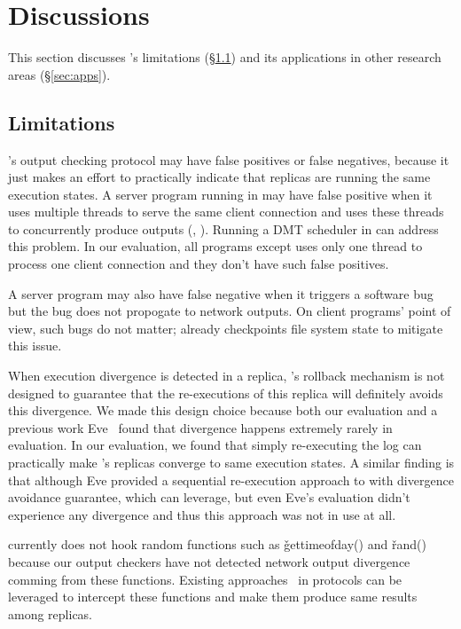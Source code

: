\section{Discussions}\label{sec:discuss}

This section discusses \xxx's limitations (\S\ref{sec:limits}) and its 
applications in other research areas (\S\ref{sec:apps}).

\subsection{Limitations}\label{sec:limits}

\xxx's output checking protocol may have false positives or false negatives, 
because it just makes an effort to practically indicate that replicas are 
running the same execution states. A server program running in \xxx may have 
false positive when it uses multiple threads to serve the same client 
connection and uses these threads to concurrently produce outputs 
(\eg, \clamav). Running a DMT scheduler in \xxx can address this problem. In 
our evaluation, all programs except \clamav uses only one thread to process one 
client connection and they don't have such false positives.

A server program may also have false negative when it triggers a software bug 
but the bug does not propogate to network outputs. On client programs' point of 
view, such bugs do not matter; \xxx already checkpoints file system state to 
mitigate this issue.

When execution divergence is detected in a replica, \xxx's rollback mechanism 
is not designed to guarantee that the re-executions of this replica will 
definitely avoids this divergence. We made this design choice because both 
our evaluation and a previous work Eve~\cite{eve:osdi12} found that divergence 
happens extremely rarely in evaluation. In our evaluation, we found that simply 
re-executing the log can practically make \xxx's replicas converge to 
same execution states. A similar finding is that although Eve provided a 
sequential re-execution approach to with divergence avoidance guarantee, which 
\xxx can leverage, but even Eve's evaluation didn't experience any divergence 
and thus this approach was not in use at all.

\xxx currently does not hook random functions such as \v{gettimeofday()} and 
\v{rand()} because our output checkers have not detected network output 
divergence comming from these functions. Existing 
approaches~\cite{eve:osdi12,paxos:practical} in \paxos protocols can be 
leveraged to intercept these functions and make them produce same results among 
replicas.

